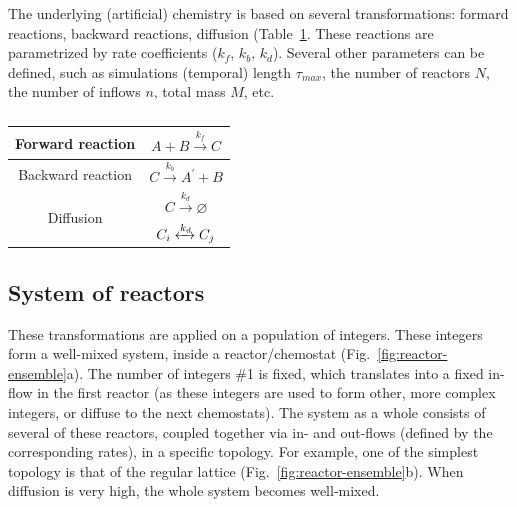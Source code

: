 \documentclass[11pt]{article}
\begin{document}
The underlying (artificial) chemistry is based on several transformations: formard reactions, backward reactions, diffusion (Table~\ref{tab:reactions}. These reactions are parametrized by rate coefficients ($k_f$, $k_b$, $k_d$). Several other parameters can be defined, such as simulations (temporal) length $\tau_{max}$, the number of reactors $N$, the number of inflows $n$, total mass $M$, etc.

\begin{table}[h]
\centering
\begin{tabular}{|c|c|}
\hline Forward reaction & $A+B \xrightarrow{k_f} C$ \\
\hline Backward reaction & $C \xrightarrow{k_b} A^{\prime}+B$ \\
\hline \multirow{2}{*}{ Diffusion } & $C \xrightarrow{k_d} \varnothing$ \\
\cline { 2 - 2 } & $C_i \xleftrightarrow{k_d} C_j$ \\
\hline
\end{tabular}  
\caption{\color{red}\protect\lipsum[2]}
\label{tab:reactions}
\end{table}

\subsection{System of reactors}

These transformations are applied on a population of integers. These integers form a well-mixed system, inside a reactor/chemostat (Fig.~\ref{fig:reactor-ensemble}a). The number of integers \#1 is fixed, which translates into a fixed in-flow in the first reactor (as these integers are used to form other, more complex integers, or diffuse to the next chemostats). The system as a whole consists of several of these reactors, coupled together via in- and out-flows (defined by the corresponding rates), in a specific topology. For example, one of the simplest topology is that of the regular lattice (Fig.~\ref{fig:reactor-ensemble}b). When diffusion is very high, the whole system becomes well-mixed.
\end{document}

